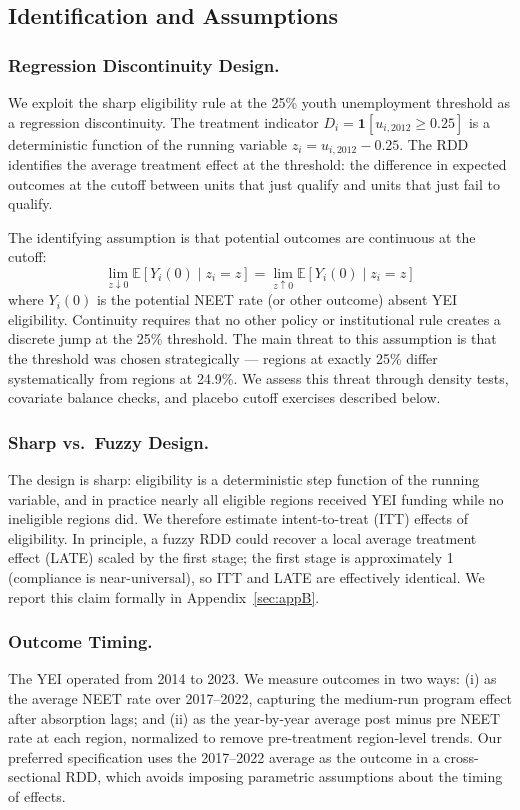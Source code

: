 \documentclass[12pt]{article}
\newcommand{\E}{\mathbb{E}}
\begin{document}
\subsection{Identification and Assumptions}

\subsubsection*{Regression Discontinuity Design.} We exploit the sharp eligibility rule at the 25\% youth unemployment threshold as a regression discontinuity. The treatment indicator $D_i = \mathbf{1}[u_{i,2012} \geq 0.25]$ is a deterministic function of the running variable $z_i = u_{i,2012} - 0.25$. The RDD identifies the average treatment effect at the threshold: the difference in expected outcomes at the cutoff between units that just qualify and units that just fail to qualify.

The identifying assumption is that potential outcomes are continuous at the cutoff:
\begin{equation}
\lim_{z \downarrow 0} \E[Y_i(0) \mid z_i = z] = \lim_{z \uparrow 0} \E[Y_i(0) \mid z_i = z]
\end{equation}
where $Y_i(0)$ is the potential NEET rate (or other outcome) absent YEI eligibility. Continuity requires that no other policy or institutional rule creates a discrete jump at the 25\% threshold. The main threat to this assumption is that the threshold was chosen strategically --- regions at exactly 25\% differ systematically from regions at 24.9\%. We assess this threat through density tests, covariate balance checks, and placebo cutoff exercises described below.

\subsubsection*{Sharp vs.\ Fuzzy Design.} The design is sharp: eligibility is a deterministic step function of the running variable, and in practice nearly all eligible regions received YEI funding while no ineligible regions did. We therefore estimate intent-to-treat (ITT) effects of eligibility. In principle, a fuzzy RDD could recover a local average treatment effect (LATE) scaled by the first stage; the first stage is approximately 1 (compliance is near-universal), so ITT and LATE are effectively identical. We report this claim formally in Appendix~\ref{sec:appB}.

\subsubsection*{Outcome Timing.} The YEI operated from 2014 to 2023. We measure outcomes in two ways: (i) as the average NEET rate over 2017--2022, capturing the medium-run program effect after absorption lags; and (ii) as the year-by-year average post minus pre NEET rate at each region, normalized to remove pre-treatment region-level trends. Our preferred specification uses the 2017--2022 average as the outcome in a cross-sectional RDD, which avoids imposing parametric assumptions about the timing of effects.
\end{document}
